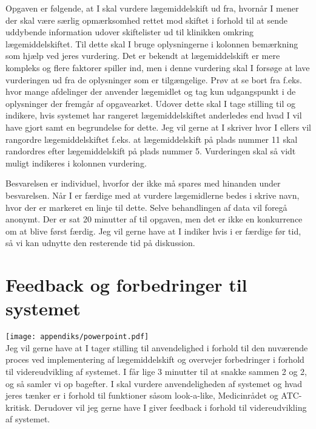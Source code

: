 Opgaven er følgende, at I skal vurdere lægemiddelskift ud fra, hvornår I mener der skal være særlig opmærksomhed rettet mod skiftet i forhold til at sende uddybende information udover skiftelister ud til klinikken omkring lægemiddelskiftet. Til dette skal I bruge oplysningerne i kolonnen bemærkning som hjælp ved jeres vurdering. Det er bekendt at lægemiddelskift er mere kompleks og flere faktorer spiller ind, men i denne vurdering skal I forsøge at lave vurderingen ud fra de oplysninger som er tilgængelige. Prøv at se bort fra f.eks. hvor mange afdelinger der anvender lægemidlet og tag kun udgangspunkt i de oplysninger der fremgår af opgavearket. Udover dette skal I tage stilling til og indikere, hvis systemet har rangeret lægemiddelskiftet anderledes end hvad I vil have gjort samt en begrundelse for dette. Jeg vil gerne at I skriver hvor I ellers vil rangordre lægemiddelskiftet f.eks. at lægemiddelskift på plads nummer 11 skal randordres efter lægemiddelskift på plads nummer 5. Vurderingen skal så vidt muligt indikeres i kolonnen vurdering.

Besvarelsen er individuel, hvorfor der ikke må spares med hinanden under besvarelsen. Når I er færdige med at vurdere lægemidlerne bedes i skrive navn, hvor der er markeret en linje til dette. Selve behandlingen af data vil foregå anonymt. Der er sat 20 minutter af til opgaven, men det er ikke en konkurrence om at blive først færdig. Jeg vil gerne have at I indiker hvis i er færdige før tid, så vi kan udnytte den resterende tid på diskussion.

\section{Feedback og forbedringer til systemet}
\texttt{[image: appendiks/powerpoint.pdf]} \\ 

Jeg vil gerne have at I tager stilling til anvendelighed i forhold til den nuværende proces ved implementering af lægemiddelskift og overvejer forbedringer i forhold til videreudvikling af systemet. I får lige 3 minutter til at snakke sammen 2 og 2, og så samler vi op bagefter. I skal  vurdere anvendeligheden af systemet og hvad jeres tænker er i forhold til funktioner såsom  look-a-like, Medicinrådet og ATC-kritisk. Derudover vil jeg gerne have I giver feedback i forhold til videreudvikling af systemet.

